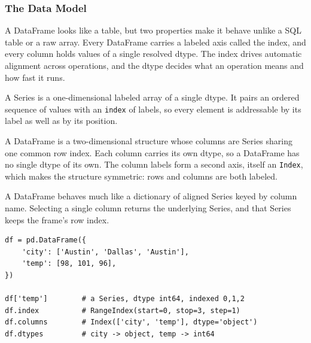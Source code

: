 \subsubsection{The Data Model}

A DataFrame looks like a table, but two properties make it behave unlike a SQL table or a raw array. Every DataFrame carries a labeled axis called the index, and every column holds values of a single resolved dtype. The index drives automatic alignment across operations, and the dtype decides what an operation means and how fast it runs.

\vspace{1ex}

\begin{definition}[Series]
A Series is a one-dimensional labeled array of a single dtype. It pairs an ordered sequence of values with an \texttt{index} of labels, so every element is addressable by its label as well as by its position.
\end{definition}

\vspace{2ex}

\begin{definition}[DataFrame]
A DataFrame is a two-dimensional structure whose columns are Series sharing one common row index. Each column carries its own dtype, so a DataFrame has no single dtype of its own. The column labels form a second axis, itself an \texttt{Index}, which makes the structure symmetric: rows and columns are both labeled.
\end{definition}

A DataFrame behaves much like a dictionary of aligned Series keyed by column name. Selecting a single column returns the underlying Series, and that Series keeps the frame's row index.

\begin{lstlisting}[style=python, caption={A frame is columns of typed Series over a shared index}]
df = pd.DataFrame({
    'city': ['Austin', 'Dallas', 'Austin'],
    'temp': [98, 101, 96],
})

df['temp']        # a Series, dtype int64, indexed 0,1,2
df.index          # RangeIndex(start=0, stop=3, step=1)
df.columns        # Index(['city', 'temp'], dtype='object')
df.dtypes         # city -> object, temp -> int64
\end{lstlisting}

